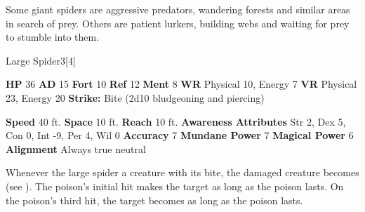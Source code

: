       Some giant spiders are aggressive predators, wandering forests and similar areas in search of prey.
      Others are patient lurkers, building webs and waiting for prey to stumble into them.
    

      
  \begin{monsubsection}{Large Spider}{3}[4]
    \vspace{-1em}\vspace{-1em}
    \vspace{0em}

    
    

    \begin{spellcontent}
      \begin{spelltargetinginfo}
        \pari \textbf{HP} 36 \monsep
          \textbf{AD} 15 \monsep
          \textbf{Fort} 10 \monsep
          \textbf{Ref} 12 \monsep
          \textbf{Ment} 8
        \pari \textbf{WR} Physical 10, Energy 7 \monsep
        \textbf{VR} Physical 23, Energy 20
        \pari \textbf{Strike:}
            Bite  (2d10 bludgeoning and piercing)
      \end{spelltargetinginfo}
    \end{spellcontent}
    \begin{monsterfooter}
      \pari \textbf{Speed} 40 ft. \monsep
        \textbf{Space} 10 ft. \monsep
        \textbf{Reach} 10 ft.
      \pari \textbf{Awareness} 
      \pari \textbf{Attributes}
        Str 2, Dex 5,
        Con 0, Int -9,
        Per 4, Wil 0
      \pari \textbf{Accuracy} 7 \monsep
        \textbf{Mundane Power} 7 \monsep
      \textbf{Magical Power} 6
      \pari \textbf{Alignment} Always true neutral
    \end{monsterfooter}
  \end{monsubsection}
        Whenever the large spider  a creature with its bite,
          the damaged creature becomes  (see ).
        The poison's initial hit makes the target  as long as the poison lasts.
        On the poison's third hit, the target becomes  as long as the poison lasts.
  

